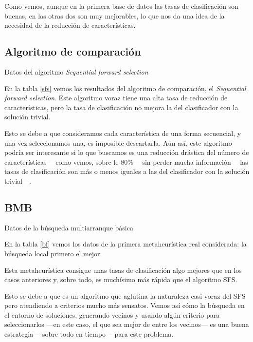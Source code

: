 \documentclass[a4paper, 11pt, titlepage]{article}
\begin{document}
    Como vemos, aunque en la primera base de datos las tasas de clasificación son buenas, en las otras dos son muy mejorables, lo que nos da una idea de la necesidad de la reducción de características.

    \subsection{Algoritmo de comparación}
    \begin{table}[!htb]
        \maketable{\dataSFS}
        \caption{Datos del algoritmo \emph{Sequential forward selection}}
        \label{sfs}
    \end{table}

    En la tabla \ref{sfs} vemos los resultados del algoritmo de comparación, el \emph{Sequential forward selection}. Este algoritmo voraz tiene una alta tasa de reducción de características, pero la tasa de clasificación no mejora la del clasificador con la solución trivial.

    Esto se debe a que consideramos cada característica de una forma secuencial, y una vez seleccionamos una, es imposible descartarla. Aún así, este algoritmo podría ser interesante si lo que buscamos es una reducción drástica del número de características ---como vemos, sobre le 80\%--- sin perder mucha información ---las tasas de clasificación son más o menos iguales a las del clasificador con la solución trivial---.

    \subsection{BMB}
    \begin{table}[!htb]
        \maketable{\dataBMB}
        \caption{Datos de la búsqueda multiarranque básica}
        \label{bf}
    \end{table}

    En la tabla \ref{bf} vemos los datos de la primera metaheurística real considerada: la búsqueda local primero el mejor.

    Esta metaheurística consigue unas tasas de clasificación algo mejores que en los casos anteriores y, sobre todo, es muchísimo más rápida que el algoritmo SFS.

    Esto se debe a que es un algoritmo que aglutina la naturaleza casi voraz del SFS pero atendiendo a criterios mucho más sensatos. Vemos así cómo la búsqueda en el entorno de soluciones, generando vecinos y usando algún criterio para seleccionarlos ---en este caso, el que sea mejor de entre los vecinos--- es una buena estrategia ---sobre todo en tiempo--- para este problema.
\end{document}
